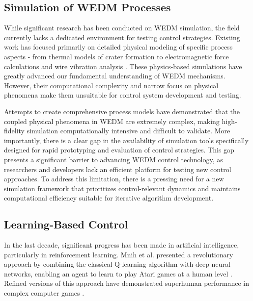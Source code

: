 \documentclass[11pt]{article}
\begin{document}
\subsection{Simulation of WEDM Processes}

While significant research has been conducted on WEDM simulation, the field currently lacks a dedicated environment for testing control strategies. Existing work has focused primarily on detailed physical modeling of specific process aspects - from thermal models of crater formation \cite{weingartner_modeling_2012} to electromagnetic force calculations \cite{di_campli_real-time_2020} and wire vibration analysis \cite{shibata_simulation_2022, sawada_development_2022}. These physics-based simulations have greatly advanced our fundamental understanding of WEDM mechanisms. However, their computational complexity and narrow focus on physical phenomena make them unsuitable for control system development and testing.

Attempts to create comprehensive process models \cite{zivanovic_wire_2016} have demonstrated that the coupled physical phenomena in WEDM are extremely complex, making high-fidelity simulation computationally intensive and difficult to validate. More importantly, there is a clear gap in the availability of simulation tools specifically designed for rapid prototyping and evaluation of control strategies. This gap presents a significant barrier to advancing WEDM control technology, as researchers and developers lack an efficient platform for testing new control approaches. To address this limitation, there is a pressing need for a new simulation framework that prioritizes control-relevant dynamics and maintains computational efficiency suitable for iterative algorithm development.


\subsection{Learning-Based Control}

In the last decade, significant progress has been made in artificial intelligence, particularly in reinforcement learning. Mnih et al. presented a revolutionary approach by combining the classical Q-learning algorithm with deep neural networks, enabling an agent to learn to play Atari games at a human level \cite{mnih2015human}. Refined versions of this approach have demonstrated superhuman performance in complex computer games \cite{DBLP:journals/corr/abs-1712-01815, vinyals2019grandmaster}.
\end{document}
